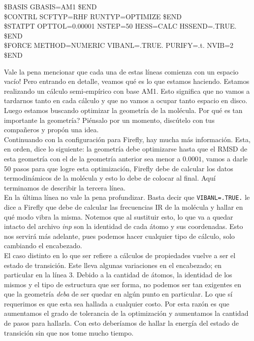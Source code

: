 \documentclass[10pt,letterpaper]{article}
\newcommand{\inlinecode}[1]{
\colorbox{light-gray}{\texttt{#1}}
}
\newenvironment{Code}
{
\begin{lrbox}{\selvestebox}%
\begin{minipage}{\dimexpr\columnwidth-2\fboxsep\relax}
\fontfamily{\ttdefault}\selectfont
}
{\end{minipage}\end{lrbox}%
\begin{center}
\colorbox{light-gray}{\usebox{\selvestebox}}
\end{center}
}
\begin{document}
\begin{Code}
\$BASIS GBASIS=AM1 \$END\\
\$CONTRL SCFTYP=RHF RUNTYP=OPTIMIZE \$END\\
\$STATPT OPTTOL=0.00001 NSTEP=50 HESS=CALC HSSEND=.TRUE. \$END\\
\$FORCE METHOD=NUMERIC VIBANL=.TRUE. PURIFY=.t. NVIB=2 \$END
\end{Code}

Vale la pena mencionar que cada una de estas l\'ineas comienza con un espacio vac\'io! Pero entrando en detalle, veamos qu\'e es lo que estamos haciendo. Estamos realizando un c\'alculo semi-emp\'irico con base AM1. Esto significa que no vamos a tardarnos tanto en cada c\'alculo y que no vamos a ocupar tanto espacio en disco. Luego estamos buscando optimizar la geometr\'ia de la mol\'ecula. Por qu\'e es tan importante la geometr\'ia? Pi\'ensalo por un momento, disc\'utelo con tus compa\~neros y prop\'on una idea.\\

Continuando con la configuraci\'on para Firefly, hay mucha m\'as informaci\'on. Esta, en orden, dice lo siguiente: la geometr\'ia debe optimizarse hasta que el RMSD de esta geometr\'ia con el de la geometr\'ia anterior sea menor a $0.0001$, vamos a darle 50 pasos para que logre esta optimizaci\'on, Firefly debe de calcular los datos termodin\'amicos de la mol\'ecula y esto lo debe de colocar al final. Aqu\'i terminamos de describir la tercera l\'inea.\\

En la \'ultima l\'inea no vale la pena profundizar. Basta decir que \inlinecode{VIBANL=.TRUE.} le dice a Firefly que debe de calcular las frecuencias IR de la mol\'ecula y hallar en qu\'e modo vibra la misma. Notemos que al sustituir esto, lo que va a quedar intacto del archivo \textit{inp} son la identidad de cada \'atomo y sus coordenadas. Esto nos servir\'a m\'as adelante, pues podemos hacer cualquier tipo de c\'alculo, solo cambiando el encabezado.\\

El caso distinto en lo que ser refiere a c\'alculos de propiedades vuelve a ser el estado de transici\'on. Este lleva algunas variaciones en el encabezado; en particular en la l\'inea 3. Debido a la cantidad de \'atomos, la identidad de los mismos y el tipo de estructura que ser forma, no podemos ser tan exigentes en que la geometr\'ia \emph{deba} de ser quedar en alg\'un punto en particular. Lo que s\'i requerimos es que esta sea hallada a cualquier costo. Por esta raz\'on es que aumentamos el grado de tolerancia de la optimizaci\'on y aumentamos la cantidad de pasos para hallarla. Con esto deber\'iamos de hallar la energ\'ia del estado de transici\'on sin que nos tome mucho tiempo.
\end{document}
